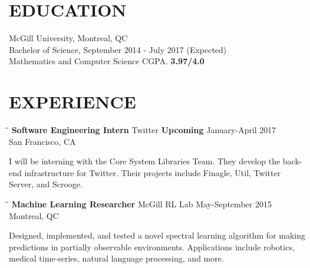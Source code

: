 \documentclass{res}
\begin{document}
 


\address{\bf  CONTACT\\66 Wolseley Ave North, MTL H4X1V7 \\lucas.langer@mail.mcgill.ca}

\address{\bf LINKS: \\ Linkedin: lucas-langer \\  Github: lucaslanger}
                                  
\begin{resume}          
 
\section{EDUCATION}          
    McGill University, Montreal, QC  \\        
    Bachelor of Science, September 2014 - July 2017 (Expected)   \\       
    Mathematics and Computer Science
    CGPA. \textbf{3.97/4.0}          

 
\section{EXPERIENCE}
   \vspace{-0.1in}	
   \begin{tabbing}
   \hspace{2.3in}\= \hspace{2.6in}\= \kill %
    {\bf Software Engineering Intern} \> Twitter \> {\bf Upcoming} January-April 2017\\
                          \> San Francisco, CA
   \end{tabbing}\vspace{-20pt}
    I will be interning with the Core System Libraries Team. They develop the back-end infrastructure for Twitter. Their projects include Finagle, Util, Twitter Server, and Scrooge.
   
   \begin{tabbing}
   \hspace{2.3in}\= \hspace{2.6in}\= \kill %
    {\bf Machine Learning Researcher} \> McGill RL Lab    \> May-September 2015\\
                             \> Montreal, QC
   \end{tabbing}\vspace{-20pt}      %
    Designed, implemented, and tested a novel spectral learning algorithm for making predictions in partially observable environments. Applications include robotics, medical time-series, natural language processing, and more. 
    

\end{resume}
\end{document}
